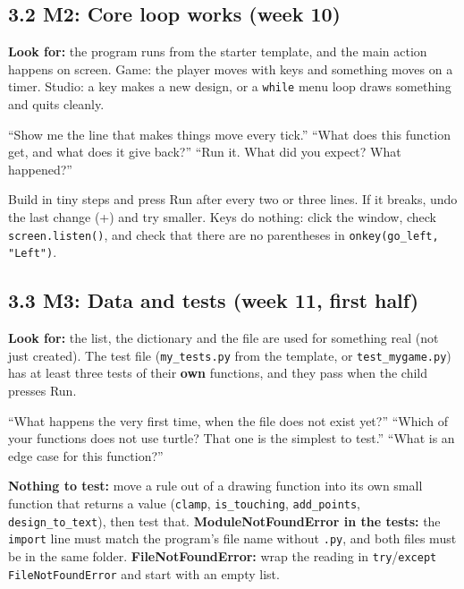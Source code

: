 \documentclass[level=2,teacher]{kidscode}
\begin{document}
\subsection{3.2 M2: Core loop works (week 10)}
\textbf{Look for:} the program runs from the starter template, and the main action happens on screen.
Game: the player moves with keys and something moves on a timer. Studio: a key makes a new design, or a
\texttt{while} menu loop draws something and quits cleanly.

\begin{teacherscript}
\enquote{Show me the line that makes things move every tick.} \enquote{What does this function get, and
what does it give back?} \enquote{Run it. What did you expect? What happened?}
\end{teacherscript}

\begin{tip}[Unblocking]
Build in tiny steps and press Run after every two or three lines. If it breaks, undo the last
change (+) and try smaller. Keys do nothing: click the window, check
\texttt{screen.listen()}, and check that there are no parentheses in \texttt{onkey(go\_left, "Left")}.
\end{tip}

\subsection{3.3 M3: Data and tests (week 11, first half)}
\textbf{Look for:} the list, the dictionary and the file are used for something real (not just
created). The test file (\texttt{my\_tests.py} from the template, or \texttt{test\_mygame.py}) has at least
three tests of their \textbf{own} functions, and they pass when the child presses Run.

\begin{teacherscript}
\enquote{What happens the very first time, when the file does not exist yet?} \enquote{Which of your
functions does not use turtle? That one is the simplest to test.} \enquote{What is an edge case for this
function?}
\end{teacherscript}

\begin{tip}[Unblocking]
\textbf{Nothing to test:} move a rule out of a drawing function into its own small function that
returns a value (\texttt{clamp}, \texttt{is\_touching}, \texttt{add\_points}, \texttt{design\_to\_text}),
then test that. \textbf{ModuleNotFoundError in the tests:} the \texttt{import} line must match the
program's file name without \texttt{.py}, and both files must be in the same folder.
\textbf{FileNotFoundError:} wrap the reading in \texttt{try}/\texttt{except FileNotFoundError} and start
with an empty list.
\end{tip}
\end{document}

